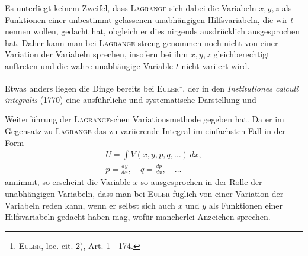 Es unterliegt keinem Zweifel, dass \textsc{Lagrange} sich dabei die Variabeln
$x,y,z$ als Funktionen einer unbestimmt gelassenen unabhängigen Hilfsvariabeln,
die wir $t$ nennen wollen, gedacht hat, obgleich er dies nirgends ausdrücklich
ausgesprochen hat. Daher kann man bei \textsc{Lagrange} streng genommen noch
nicht von einer Variation der  Variabeln sprechen, insofern
bei ihm $x,y,z$ gleichberechtigt auftreten und die wahre unabhängige Variable
$t$ nicht variiert wird.

Etwas anders liegen die Dinge bereits bei \textsc{Euler}\footnote{\textsc{Euler}, loc. cit. 2), Art. 1—174.}, der in den \textit{Institutiones
calculi integralis} (1770) eine ausführliche und systematische Darstellung und
\par\clearpage{}
\noindent Weiterführung der \textsc{Lagrange}schen Variationsmethode gegeben hat. Da er im
Gegensatz zu \textsc{Lagrange} das zu variierende Integral im einfachsten Fall in
der Form
\[
\begin{gathered}
U=\int V(x,y,p,q,\ldots)\,dx,\\
p=\frac{dy}{dx},\quad q=\frac{dp}{dx},\quad\ldots
\end{gathered}
\]
annimmt, so erscheint die Variable $x$ so ausgesprochen in der Rolle der unabhängigen
Variabeln, dass man bei \textsc{Euler} füglich von einer Variation der
 Variabeln reden kann, wenn er selbst sich auch $x$ und $y$
als Funktionen einer Hilfsvariabeln gedacht haben mag, wofür mancherlei
Anzeichen sprechen.

